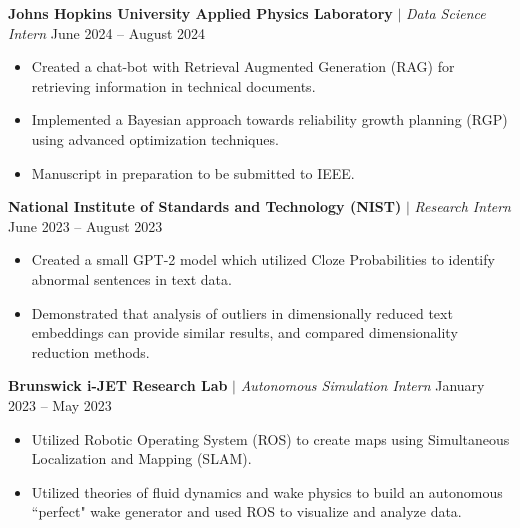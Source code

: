 \documentclass[letterpaper,10pt]{article}
\begin{document}
\textbf{Johns Hopkins University Applied Physics Laboratory} $|$ \textit{Data Science Intern} \hfill June 2024 -- August 2024\vspace{-5pt}
\begin{itemize}[itemsep=-5pt, parsep=5pt, leftmargin=0.25in]
    \item Created a chat-bot with Retrieval Augmented Generation (RAG) for retrieving information in technical documents.
    \item Implemented a Bayesian approach towards reliability growth planning (RGP) using advanced optimization techniques.
    \item Manuscript in preparation to be submitted to IEEE.
\end{itemize}

\textbf{National Institute of Standards and Technology (NIST)} $|$ \textit{Research Intern} \hfill June 2023 -- August 2023\vspace{-5pt}
\begin{itemize}[itemsep=-5pt, parsep=5pt, leftmargin=0.25in]
    \item Created a small GPT-2 model which utilized Cloze Probabilities to identify abnormal sentences in text data.
    \item Demonstrated that analysis of outliers in dimensionally reduced text embeddings can provide similar results, and compared dimensionality reduction methods.
\end{itemize}

\textbf{Brunswick i-JET Research Lab} $|$ \textit{Autonomous Simulation Intern} \hfill January 2023 -- May 2023\vspace{-5pt}
\begin{itemize}[itemsep=-5pt, parsep=5pt, leftmargin=0.25in]
    \item Utilized Robotic Operating System (ROS) to create maps using Simultaneous Localization and Mapping (SLAM).
    \item Utilized theories of fluid dynamics and wake physics to build an autonomous ``perfect" wake generator and used ROS to visualize and analyze data.
\end{itemize}

\end{document}
